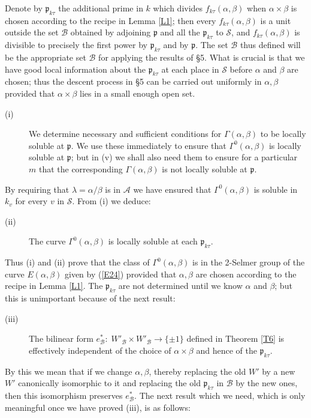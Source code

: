 \documentclass[12pt]{article}
\def\fp{{\mathfrak p}}
\def\ga{{\alpha}}
\def\gb{{\beta}}
\def\gG{{\Gamma}}
\def\gl{{\lambda}}
\def\sA{{\mathcal A}}
\def\sB{{\mathcal B}}
\def\sS{{\mathcal S}}
\begin{document}
Denote by $\fp_{k\tau}$ the additional prime in $k$ which
divides $f_{k\tau}(\ga,\gb)$ when $\ga\times\gb$ is chosen
according to the recipe in Lemma \ref{L1}; then every
$f_{k\tau}(\ga,\gb)$ is a unit outside the set $\sB$
obtained by adjoining $\fp$ and all the $\fp_{k\tau}$ to
$\sS$, and $f_{k\tau}(\ga,\gb)$ is divisible to precisely the
first power by $\fp_{k\tau}$ and by $\fp$.
The set $\sB$ thus defined will be the appropriate
set $\sB$ for applying the results of \S5. What is crucial is
that we have good local information about the $\fp_{k\tau}$
at each place in $\sS$ before $\ga$ and $\gb$ are chosen;
thus the descent process in \S5 can be carried out uniformly
in $\ga,\gb$ provided that
$\ga\times\gb$ lies in a small enough open set.
\begin{description}
\item[(i)] We determine necessary and sufficient conditions
for $\gG(\ga,\gb)$ to be locally soluble at $\fp$. We use
these immediately to ensure that $\gG^0(\ga,\gb)$ is locally
soluble at $\fp$; but in (v) we shall also need them to
ensure for a particular $m$ that the corresponding
$\gG(\ga,\gb)$ is not locally soluble at $\fp$.
\end{description}
By requiring that $\gl=\ga/\gb$ is in $\sA$ we have ensured
that $\gG^0(\ga,\gb)$ is soluble in $k_v$ for every $v$ in
$\sS$. From (i) we deduce:
\begin{description}
\item[(ii)] The curve $\gG^0(\ga,\gb)$ is locally soluble at
each $\fp_{k\tau}$.
\end{description}
Thus (i) and (ii) prove that the class of $\gG^0(\ga,\gb)$ is
in the 2-Selmer group of the curve $E(\ga,\gb)$ given by
(\ref{E24}) provided that $\ga,\gb$ are chosen according to
the recipe in Lemma \ref{L1}.
The $\fp_{k\tau}$ are not determined until we know $\ga$ and
$\gb$; but this is unimportant because of the next result:
\begin{description}
\item[(iii)] The bilinear form $e^*_\sB:\;W'_\sB\times W'_\sB\rightarrow
\{\pm1\}$ defined in Theorem \ref{T6} is effectively independent of the choice
of $\ga\times\gb$ and hence of the $\fp_{k\tau}$.
\end{description}
By this we mean that if we change $\ga,\gb$, thereby replacing the old $W'$ by
a new $W'$ canonically isomorphic to it and replacing the old $\fp_{k\tau}$ in
$\sB$ by the new ones, then this isomorphism preserves
$e^*_\sB$. The next result which we need,
which is only meaningful once we have proved (iii), is as follows:
\end{document}
